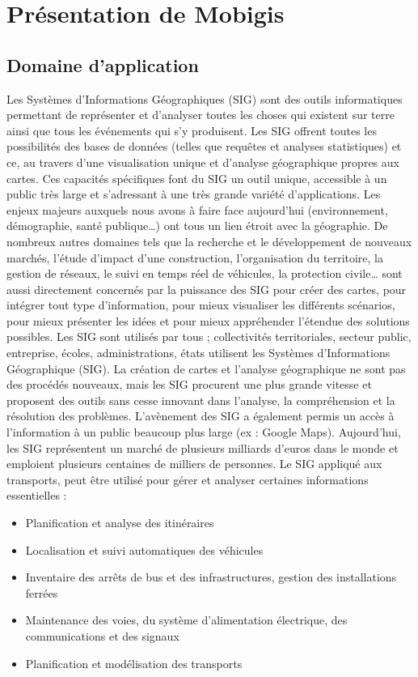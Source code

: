 \chapter{Présentation de Mobigis}
\label{PresentationEntreprise}

\section{Domaine d'application}\label{sig}

Les Systèmes d’Informations Géographiques (SIG) sont des outils informatiques permettant de représenter et d’analyser toutes les choses qui existent sur terre ainsi que tous les événements qui s’y produisent.
Les SIG offrent toutes les possibilités des bases de données (telles que requêtes et analyses statistiques) et ce, au travers d’une visualisation unique et d’analyse géographique propres aux cartes. Ces capacités spécifiques font du SIG un outil unique, accessible à un public très large et s’adressant à une très grande variété d’applications. 
Les enjeux majeurs auxquels nous avons à faire face aujourd’hui (environnement, démographie, santé publique…) ont tous un lien étroit avec la géographie. De nombreux autres domaines tels que la recherche et le développement de nouveaux marchés, l’étude d’impact d’une construction, l’organisation du territoire, la gestion de réseaux, le suivi en temps réel de véhicules, la protection civile… sont aussi directement concernés par la puissance des SIG pour créer des cartes, pour intégrer tout type d’information, pour mieux visualiser les différents scénarios, pour mieux présenter les idées et pour mieux appréhender l’étendue des solutions possibles.
Les SIG sont utilisés par tous ; collectivités territoriales, secteur public, entreprise, écoles, administrations, états utilisent les Systèmes d’Informations Géographique (SIG). La création de cartes et l’analyse géographique ne sont pas des procédés nouveaux, mais les SIG procurent une plus grande vitesse et proposent des outils sans cesse innovant dans l’analyse, la compréhension et la résolution des problèmes.
L’avènement des SIG a également permis un accès à l’information à un public beaucoup plus large (ex : Google Maps). Aujourd’hui, les SIG représentent un marché de plusieurs milliards d'euros dans le monde et emploient plusieurs centaines de milliers de personnes. 
Le SIG appliqué aux transports, peut être utilisé pour gérer et analyser certaines informations essentielles :
\begin{itemize}
\item Planification et analyse des itinéraires 
\item Localisation et suivi automatiques des véhicules 
\item Inventaire des arrêts de bus et des infrastructures, gestion des installations ferrées 
\item Maintenance des voies, du système d'alimentation électrique, des communications et des signaux 
\item Planification et modélisation des transports
\end{itemize}

